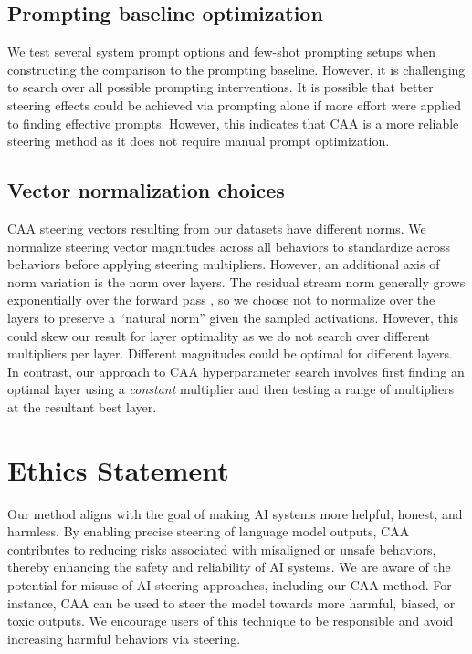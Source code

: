 \documentclass[11pt]{article}
\begin{document}
\subsection*{Prompting baseline optimization}
We test several system prompt options and few-shot prompting setups when constructing the comparison to the prompting baseline. However, it is challenging to search over all possible prompting interventions. It is possible that better steering effects could be achieved via prompting alone if more effort were applied to finding effective prompts. However, this indicates that CAA is a more reliable steering method as it does not require manual prompt optimization. 

\subsection*{Vector normalization choices}
CAA steering vectors resulting from our datasets have different norms. We normalize steering vector magnitudes across all behaviors to standardize across behaviors before applying steering multipliers. However, an additional axis of norm variation is the norm over layers. The residual stream norm generally grows exponentially over the forward pass \citep{residnorm}, so we choose not to normalize over the layers to preserve a ``natural norm'' given the sampled activations. However, this could skew our result for layer optimality as we do not search over different multipliers per layer. Different magnitudes could be optimal for different layers. In contrast, our approach to CAA hyperparameter search involves first finding an optimal layer using a \textit{constant} multiplier and then testing a range of multipliers at the resultant best layer.

\section*{Ethics Statement}

Our method aligns with the goal of making AI systems more helpful, honest, and harmless. By enabling precise steering of language model outputs, CAA contributes to reducing risks associated with misaligned or unsafe behaviors, thereby enhancing the safety and reliability of AI systems. We are aware of the potential for misuse of AI steering approaches, including our CAA method. For instance, CAA can be used to steer the model towards more harmful, biased, or toxic outputs. We encourage users of this technique to be responsible and avoid increasing harmful behaviors via steering.
\end{document}
